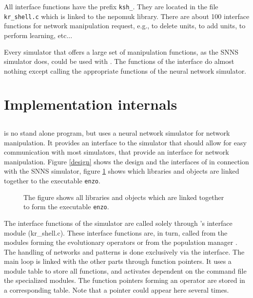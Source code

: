 All  interface functions have the prefix \verb+ksh_+. They are located
in the file \verb+kr_shell.c+ which is linked to the nepomuk library.
There are about 100 interface functions for network manipulation request, e.g.,
to delete units, to add units, to perform learning, etc...

Every simulator that offers a large set of manipulation functions, as the SNNS simulator does,
could be used with \ENZO.
The functions of the interface do almost nothing except calling the
appropriate functions of the neural network simulator. 





\section{Implementation internals}

\subsection{\ENZO }

\ENZO is no stand alone program, but uses a neural network simulator for
network manipulation. It provides an interface to the simulator that should
allow for easy communication with most simulators, that provide an interface
for network manipulation. Figure \ref{design} shows the design and the interfaces of
\ENZO in connection with the SNNS simulator,
figure \ref{link} shows which libraries and objects are linked together to
the executable \verb+enzo+.

\begin{figure}[thb]
\centerline{ }
\caption[Linking the executable ]{ \label{link}
{\small The figure shows all libraries and objects which are linked
together to form the executable \verb+enzo+. 
}}
\end{figure}

The interface functions of the simulator are called solely through \ENZO's interface
module (kr\_shell.c). These interface functions are, in turn, called from the modules
forming the evolutionary operators or from the population manager \nepomuk.
The handling of networks and patterns 
is done exclusively via the \nepomuk interface.
The main loop is linked with the other parts through function pointers.
It uses a module table to store all functions, and activates dependent on the command file
the specialized modules.
The function pointers forming an operator are  stored in a corresponding table. Note that
a pointer could appear here several times.

